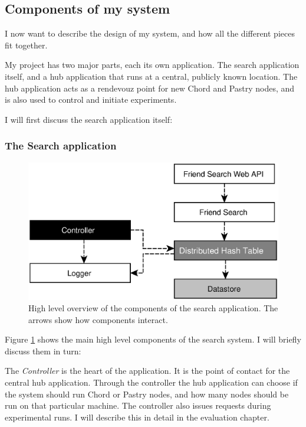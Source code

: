 \subsection{Components of my system}
I now want to describe the design of my system, and how all the different pieces fit together.

My project has two major parts, each its own application. The search application itself, and a hub application that runs at a central, publicly known location. The hub application acts as a rendevouz point for new Chord and Pastry nodes, and is also used to control and initiate experiments.

\mbox{}

I will first discuss the search application itself:


\subsubsection{The Search application}

\begin{figure}[!htb]
\begin{center}
	\includegraphics[width=0.9\linewidth]{illustrations/ComponentOverview.eps}
\caption{High level overview of the components of the search application. The arrows show how components interact.}
\label{figComponents}
\end{center}
\end{figure}

Figure \ref{figComponents} shows the main high level components of the search system. I will briefly discuss them in turn:

The \emph{Controller} is the heart of the application. It is the point of contact for the central hub application. Through the controller the hub application can choose if the system should run Chord or Pastry nodes, and how many nodes should be run on that particular machine. The controller also issues requests during experimental runs. I will describe this in detail in the evaluation chapter.

